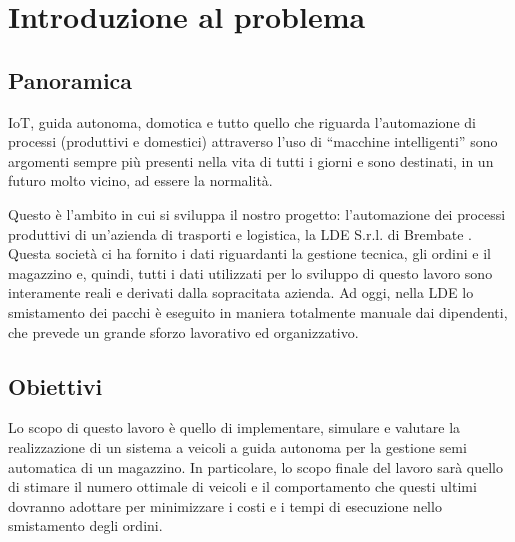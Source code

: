 \documentclass[12pt]{article}
\begin{document}
\begin{titlepage}

\vfill %
\end{titlepage}



\tableofcontents

\newpage

\listoffigures

\listoftables



\newpage 
\section{Introduzione al problema} %
\subsection{Panoramica}
IoT, guida autonoma, domotica e tutto quello che riguarda l’automazione di processi (produttivi e domestici) attraverso l’uso di “macchine intelligenti” sono argomenti sempre più presenti nella vita di tutti i giorni e sono destinati, in un futuro molto vicino, ad essere la normalità.

\noindent Questo è l’ambito in cui si sviluppa il nostro progetto: l’automazione dei processi produttivi di un’azienda di trasporti e logistica, la LDE S.r.l. di Brembate . Questa società ci ha fornito i dati riguardanti la gestione tecnica, gli ordini e il magazzino e, quindi, tutti i dati utilizzati per lo sviluppo di questo lavoro sono interamente reali e derivati dalla sopracitata azienda.
Ad oggi, nella LDE lo smistamento dei pacchi è eseguito in maniera totalmente manuale dai dipendenti, che prevede un grande sforzo lavorativo ed organizzativo.

\subsection{Obiettivi}
Lo scopo di questo lavoro è quello di implementare, simulare e valutare la realizzazione di un sistema a veicoli a guida autonoma per la gestione semi automatica di un magazzino.
In particolare, lo scopo finale del lavoro sarà quello di stimare il numero ottimale di veicoli e il comportamento che questi ultimi dovranno adottare per minimizzare i costi e i tempi di esecuzione nello smistamento degli ordini.
\end{document}
